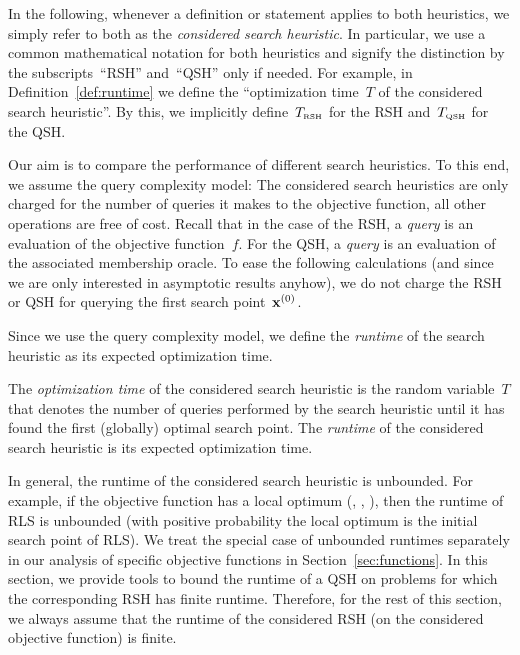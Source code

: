 \documentclass[a4paper,11pt]{article}
\begin{document}
In the following, whenever a definition or statement applies to both
heuristics, we simply refer to both as the \emph{considered search
  heuristic}. In particular, we use a common mathematical notation for
both heuristics and signify the distinction by the subscripts~``RSH''
and~``QSH'' only if needed. For example, in
Definition~\ref{def:runtime} we define the ``optimization time~$T$ of
the considered search heuristic''. By this, we implicitly
define~$T_{\text{\tiny\rm RSH}}$ for the RSH and~$T_{\text{\tiny\rm QSH}}$ for the QSH.

Our aim is to compare the performance of different search heuristics. To this end, we assume the query complexity model: The considered search heuristics are only charged for the number of queries it makes to the objective function, all other operations are free of cost. Recall that in the case of the RSH, a \emph{query} is an evaluation of the objective function~$f$. For the QSH, a \emph{query} is an evaluation of the associated membership oracle. To ease the following calculations (and since we are only interested in asymptotic results anyhow), we do not charge the RSH or QSH for querying the first search point~$\xvec[0]$.

Since we use the query complexity model, we define the \emph{runtime} of the search heuristic as its expected optimization time.

\begin{definition}
\label{def:runtime}
The \emph{optimization time} of the considered search heuristic is the random variable~$T$ that denotes the number of queries performed by the search heuristic until it has found the first (globally) optimal search point. The \emph{runtime} of the considered search heuristic is its expected optimization time. 
\end{definition}

In general, the runtime of the considered search heuristic is unbounded. For example, if the objective function has a local optimum (\jump, \needle, \tinytrap), then the runtime of RLS is unbounded (with positive probability the local optimum is the initial search point of RLS). We treat the special case of unbounded runtimes separately in our analysis of specific objective functions in Section~\ref{sec:functions}. In this section, we provide tools to bound the runtime of a QSH on problems for which the corresponding RSH has finite runtime. Therefore, for the rest of this section, we always assume that the runtime of the considered RSH (on the considered objective function) is finite.
\end{document}
